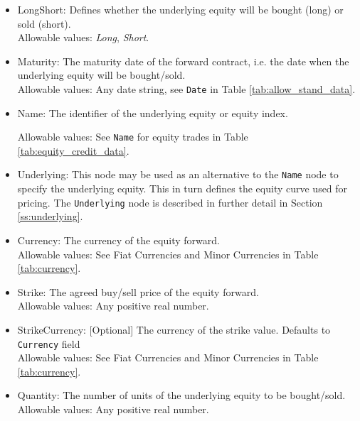 \begin{itemize}
	\item LongShort: Defines whether the underlying equity will be bought (long) or sold (short). \\
	Allowable values:  \emph{Long}, \emph{Short}.
	\item Maturity: The maturity date of the forward contract, i.e. the date when the underlying equity will be bought/sold. \\
	Allowable values: Any date string, see \lstinline!Date! in Table \ref{tab:allow_stand_data}.
	\item Name: The identifier of the underlying equity or equity index. 
	
	Allowable values:  See \lstinline!Name! for equity trades in Table \ref{tab:equity_credit_data}. \\
	\item Underlying:  This node may be used as an alternative to the \lstinline!Name! node to specify the underlying equity. This in turn defines the equity curve used for pricing. The \lstinline!Underlying! node is described in further detail in Section \ref{ss:underlying}. \\
	\item Currency: The  currency of the equity forward. \\
	Allowable values:  See Fiat Currencies and Minor Currencies in Table \ref{tab:currency}.
	\item Strike: The agreed buy/sell price of the equity forward. \\
	Allowable values:  Any positive real number.	
	\item StrikeCurrency: [Optional] The currency of the strike value. Defaults to \lstinline!Currency! field \\
	Allowable values:  See Fiat Currencies and Minor Currencies in Table \ref{tab:currency}.	
	\item Quantity: The number of units of the underlying equity to be bought/sold. \\
	Allowable values:  Any positive real number.
\end{itemize}